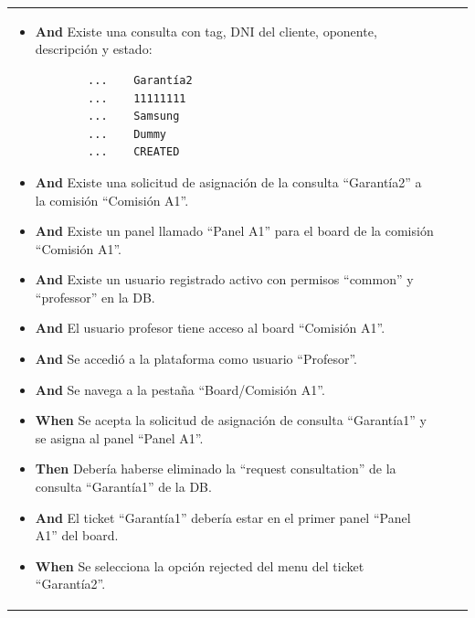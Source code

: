 \begin{longtable}{|p{1cm}|p{2.5cm}|p{12cm}|}
\begin{itemize}
        \item \textbf{And} Existe una consulta con tag, DNI del cliente, oponente, descripción y estado:
        \begin{verbatim}
        ...    Garantía2
        ...    11111111
        ...    Samsung
        ...    Dummy
        ...    CREATED
        \end{verbatim}
        \item \textbf{And} Existe una solicitud de asignación de la consulta ``Garant\'ia2'' a la comisión ``Comisión A1''.
        \item \textbf{And} Existe un panel llamado ``Panel A1'' para el board de la comisión ``Comisión A1''.
        \item \textbf{And} Existe un usuario registrado activo con permisos ``common'' y ``professor'' en la DB.
        \item \textbf{And} El usuario profesor tiene acceso al board ``Comisión A1''.
        \item \textbf{And} Se accedió a la plataforma como usuario ``Profesor''.
        \item \textbf{And} Se navega a la pestaña ``Board/Comisión A1''.
        \newline
        \item \textbf{When} Se acepta la solicitud de asignación de consulta ``Garant\'ia1'' y se asigna al panel ``Panel A1''.
        \newline
        
        \item \textbf{Then} Debería haberse eliminado la ``request consultation'' de la consulta ``Garant\'ia1'' de la DB.
        \item \textbf{And} El ticket ``Garant\'ia1'' debería estar en el primer panel ``Panel A1'' del board.
        \newline
        
        \item \textbf{When} Se selecciona la opción rejected del menu del ticket ``Garant\'ia2''.
        \newline


\end{itemize}
\end{longtable}
